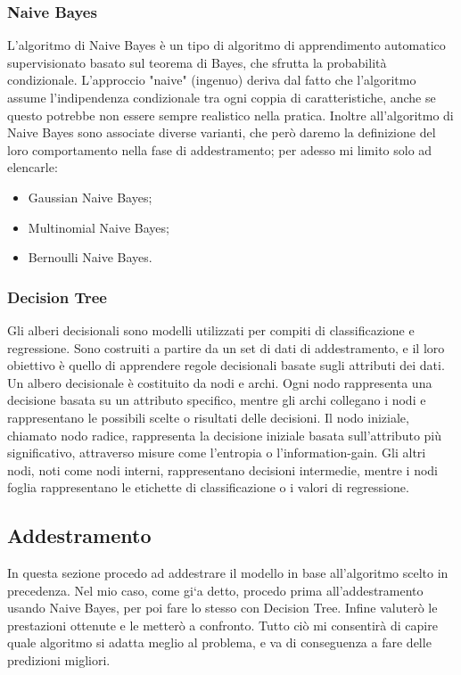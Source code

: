 \documentclass{article}
\begin{document}
\begin{titlepage}
        \subsubsection{Naive Bayes}
        L'algoritmo di Naive Bayes è un tipo di algoritmo di apprendimento automatico supervisionato basato sul teorema di Bayes, che sfrutta la probabilità condizionale. L'approccio "naive" (ingenuo) deriva dal fatto che l'algoritmo assume l'indipendenza condizionale tra ogni coppia di caratteristiche, anche se questo potrebbe non essere sempre realistico nella pratica.
        Inoltre all'algoritmo di Naive Bayes sono associate diverse varianti, che però daremo la definizione del loro comportamento nella fase di addestramento; per adesso mi limito solo ad elencarle:
        \begin{itemize}
            \item Gaussian Naive Bayes;
            \item Multinomial Naive Bayes;
            \item Bernoulli Naive Bayes.
        \end{itemize}

        \subsubsection{Decision Tree}
        Gli alberi decisionali sono modelli utilizzati per compiti di classificazione e regressione. Sono costruiti a partire da un set di dati di addestramento, e il loro obiettivo è quello di apprendere regole decisionali basate sugli attributi dei dati.
        Un albero decisionale è costituito da nodi e archi. Ogni nodo rappresenta una decisione basata su un attributo specifico, mentre gli archi collegano i nodi e rappresentano le possibili scelte o risultati delle decisioni. Il nodo iniziale, chiamato nodo radice, rappresenta la decisione iniziale basata sull'attributo più significativo, attraverso misure come l’entropia
        o l’information-gain. Gli altri nodi, noti come nodi interni, rappresentano decisioni intermedie, mentre i nodi foglia rappresentano le etichette di classificazione o i valori di regressione.

        \newpage
        \subsection{Addestramento}
         In questa sezione procedo ad addestrare il modello in base all’algoritmo scelto in precedenza. Nel mio caso, come gi`a detto, procedo prima all’addestramento usando Naive Bayes, per poi fare lo stesso con Decision Tree. Infine valuterò le
         prestazioni ottenute e le metterò a confronto. Tutto ciò mi consentirà di capire quale algoritmo si adatta meglio al problema, e va di conseguenza a fare delle predizioni migliori.
        


\end{titlepage}
\end{document}
